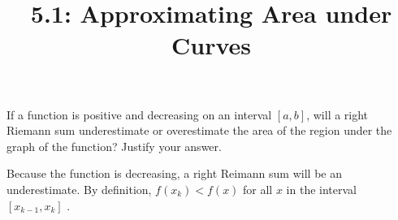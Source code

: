\documentclass[nooutcomes]{ximera}
\title{5.1: Approximating Area under Curves}
\begin{document}
\begin{abstract}

\end{abstract}
\maketitle


\begin{problem}
  If a function is positive and decreasing on an interval $[a,b]$,  will a right Riemann sum underestimate or overestimate the area of the region under the graph of the function?
  Justify your answer.

\begin{freeResponse}
  Because the function is decreasing, a right Reimann sum will be an underestimate.
  By definition, $f(x_k)< f(x)$ for all $x$ in the interval $[x_{k-1},x_k]$ .
\end{freeResponse}	
		

\end{problem}
\end{document}
